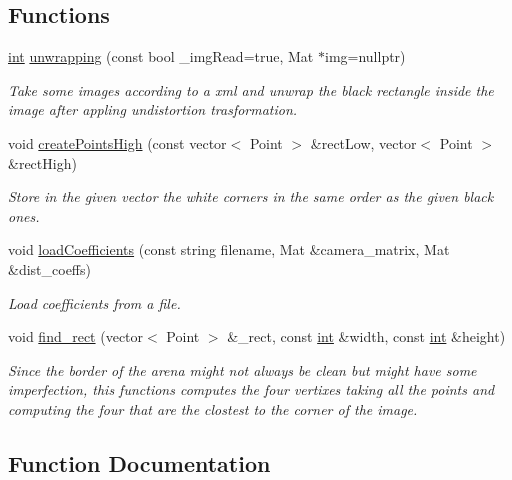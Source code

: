\subsection*{Functions}
\begin{DoxyCompactItemize}
\item 
\mbox{\hyperlink{draw_8hh_aa620a13339ac3a1177c86edc549fda9b}{int}} \mbox{\hyperlink{unwrapping_8hh_a9497176b75c2f48a3a110adce953312f}{unwrapping}} (const bool \+\_\+img\+Read=true, Mat $\ast$img=nullptr)
\begin{DoxyCompactList}\small\item\em Take some images according to a xml and unwrap the black rectangle inside the image after appling undistortion trasformation. \end{DoxyCompactList}\item 
void \mbox{\hyperlink{unwrapping_8hh_ac0327df69102bf644a011c245ae7ad4f}{create\+Points\+High}} (const vector$<$ Point $>$ \&rect\+Low, vector$<$ Point $>$ \&rect\+High)
\begin{DoxyCompactList}\small\item\em Store in the given vector the white corners in the same order as the given black ones. \end{DoxyCompactList}\item 
void \mbox{\hyperlink{unwrapping_8hh_a3cf7df08897ed4d1a7ddcf055b18cca8}{load\+Coefficients}} (const string filename, Mat \&camera\+\_\+matrix, Mat \&dist\+\_\+coeffs)
\begin{DoxyCompactList}\small\item\em Load coefficients from a file. \end{DoxyCompactList}\item 
void \mbox{\hyperlink{unwrapping_8hh_ac30b4dbae9022e84e10ef97ba156c581}{find\+\_\+rect}} (vector$<$ Point $>$ \&\+\_\+rect, const \mbox{\hyperlink{draw_8hh_aa620a13339ac3a1177c86edc549fda9b}{int}} \&width, const \mbox{\hyperlink{draw_8hh_aa620a13339ac3a1177c86edc549fda9b}{int}} \&height)
\begin{DoxyCompactList}\small\item\em Since the border of the arena might not always be clean but might have some imperfection, this functions computes the four vertixes taking all the points and computing the four that are the clostest to the corner of the image. \end{DoxyCompactList}\end{DoxyCompactItemize}


\subsection{Function Documentation}
\mbox{\label{unwrapping_8hh_ac0327df69102bf644a011c245ae7ad4f}} 
